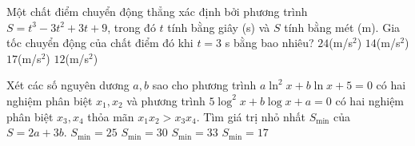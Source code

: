 \begin{ex}%
Một chất điểm chuyển động thẳng xác định bởi phương trình \break $S=t^3-3t^2+3t+9$, trong đó $t$ tính bằng giây (s) và $S$ tính bằng mét (m). Gia tốc chuyển động của chất điểm đó khi $t=3$ s bằng bao nhiêu?
\choice
{$24$(m/s$^2$)}
{$14$(m/s$^2$)}
{$17$(m/s$^2$)}
{\True $12$(m/s$^2$)}
\end{ex}
\begin{ex}%
Xét các số nguyên dương $a,b$ sao cho phương trình $a\ln^2x+b\ln x+5=0$ có hai nghiệm phân biệt $x_1,x_2$ và phương trình $5\log^2x+b\log x+a=0$ có hai nghiệm phân biệt $x_3,x_4$ thỏa mãn $x_1x_2>x_3x_4$. Tìm giá trị nhỏ nhất $S_{\text{min}}$ của $S=2a+3b$.
\choice
{$S_{\text{min}}=25$}
{\True $S_{\text{min}}=30$}
{$S_{\text{min}}=33$}
{$S_{\text{min}}=17$}
\end{ex}
